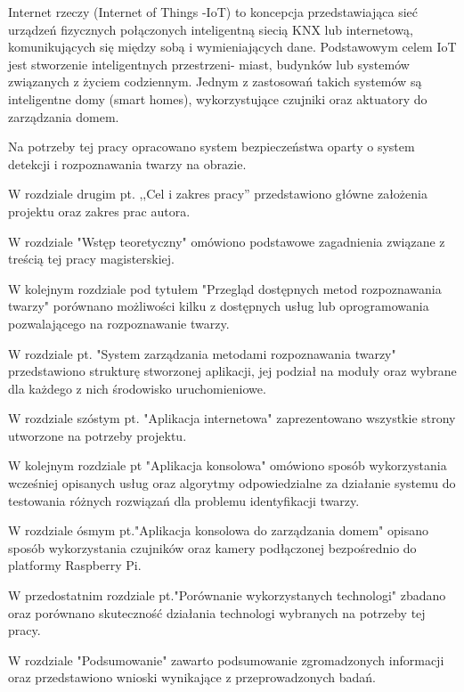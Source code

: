 Internet rzeczy (Internet of Things -IoT) to koncepcja przedstawiająca sieć urządzeń fizycznych połączonych inteligentną siecią KNX lub internetową, komunikujących się między sobą i wymieniających dane. Podstawowym celem IoT jest stworzenie inteligentnych przestrzeni- miast, budynków lub systemów związanych z życiem codziennym. Jednym z zastosowań takich systemów są inteligentne domy (smart homes), wykorzystujące czujniki oraz aktuatory do zarządzania domem.

Na potrzeby tej pracy opracowano system bezpieczeństwa oparty o system detekcji i rozpoznawania twarzy na obrazie.


W rozdziale drugim pt. ,,Cel i zakres pracy'' przedstawiono główne założenia projektu oraz zakres prac autora.

W rozdziale "Wstęp teoretyczny" omówiono podstawowe zagadnienia związane z treścią tej pracy magisterskiej.

W kolejnym rozdziale pod tytułem "Przegląd dostępnych metod rozpoznawania twarzy" porównano możliwości kilku z dostępnych usług lub oprogramowania pozwalającego na rozpoznawanie twarzy.

W rozdziale pt. "System zarządzania metodami rozpoznawania twarzy" przedstawiono strukturę stworzonej aplikacji, jej podział na moduły oraz wybrane dla każdego z nich środowisko uruchomieniowe.

W rozdziale szóstym pt. "Aplikacja internetowa" zaprezentowano wszystkie strony utworzone na potrzeby projektu.

W kolejnym rozdziale pt "Aplikacja konsolowa" omówiono sposób wykorzystania wcześniej opisanych usług oraz algorytmy odpowiedzialne za działanie systemu do testowania różnych rozwiązań dla problemu identyfikacji twarzy.

W rozdziale ósmym pt."Aplikacja konsolowa do zarządzania domem" opisano sposób wykorzystania czujników oraz kamery podłączonej bezpośrednio do platformy Raspberry Pi.

W przedostatnim rozdziale pt."Porównanie wykorzystanych technologi" zbadano oraz porównano skuteczność działania technologi wybranych na potrzeby tej pracy.

W rozdziale "Podsumowanie" zawarto podsumowanie zgromadzonych informacji oraz przedstawiono wnioski wynikające z przeprowadzonych badań.



